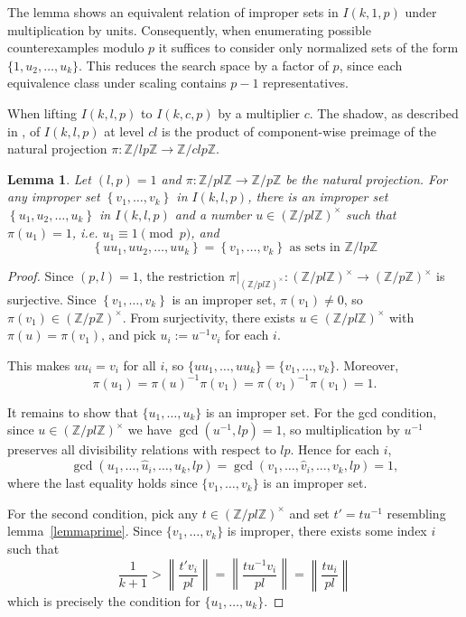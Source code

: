 \documentclass[10pt,leqno]{amsart}
\newtheorem{lemma}[theorem]{Lemma}
\newcommand{\set}[1]{\left\{#1\right\}}
\newcommand{\norm}[1]{\left\|#1\right\|}
\newcommand{\Int}[1]{\mathbb Z / #1 \mathbb Z}
\begin{document}
The lemma shows an equivalent relation of improper sets in $I(k, 1, p)$ under multiplication by units. 
Consequently, when enumerating possible counterexamples modulo $p$ it suffices to consider
only normalized sets of the form $\{1,u_2,\dots,u_k\}$.  This reduces the search space by a factor of $p$, since each equivalence class under scaling
contains $p-1$ representatives.

When lifting $I(k, l, p)$ to $I(k, c, p)$ by a multiplier $c$. The shadow, as described in \cite{Trakultongchai},
of $I(k, l, p)$ at level $cl$ is the product of component-wise preimage of the natural projection $\pi: \Int{lp} \to \Int{clp}$.

\begin{lemma}
  Let $(l, p) = 1$ and $\pi: \Int{pl} \to \Int{p}$ be the natural projection.
  For any improper set $\set{v_1, \dots, v_k}$ in $I(k, l, p)$, there is an improper set $\set{u_1, u_2, \dots, u_k}$ in $I(k, l, p)$
  and a number $u \in (\Int{pl})^\times$ such that $\pi(u_1) = 1$, i.e. $u_1 \equiv 1 \pmod{p}$,
  and \[ \set{uu_1, uu_2, \dots, uu_k} = \set{v_1, \dots, v_k} \text{ as sets in } \Int{lp} \]
\end{lemma}

\begin{proof}
  Since $(p, l) = 1$, the restriction $\pi|_{(\Int{pl})^\times} : (\Int{pl})^\times \to (\Int{p})^\times$ 
  is surjective. Since $\set{v_1,\dots,v_k}$ is an improper set, $\pi(v_1) \neq 0$, so 
  $\pi(v_1) \in (\Int{p})^\times$. From surjectivity, there exists $u \in (\Int{pl})^\times$ with $\pi(u) = \pi(v_1)$, 
  and pick $u_i := u^{-1} v_i$ for each $i$. 

  This makes $u u_i = v_i$ for all $i$, so 
  $\{u u_1, \dots, u u_k\} = \{v_1, \dots, v_k\}$. Moreover,
  \[
    \pi(u_1) = \pi(u)^{-1}\pi(v_1) = \pi(v_1)^{-1}\pi(v_1) = 1.
  \]

  It remains to show that $\{u_1, \dots, u_k\}$ is an improper set. For the gcd condition, 
  since $u \in (\Int{pl})^\times$ we have $\gcd(u^{-1}, lp) = 1$, so multiplication by $u^{-1}$ 
  preserves all divisibility relations with respect to $lp$. Hence for each $i$,
  \[
    \gcd(u_1, \dots, \hat{u}_i, \dots, u_k, lp) = \gcd(v_1, \dots, \hat{v}_i, \dots, v_k, lp) = 1,
  \]
  where the last equality holds since $\{v_1, \dots, v_k\}$ is an improper set.

  For the second condition, pick any $t \in (\Int{pl})^\times$ and set $t' = tu^{-1}$ resembling lemma~\ref{lemmaprime}.
  Since $\{v_1, \dots, v_k\}$ is improper, there exists some index $i$ such that
  \[
    \frac{1}{k+1} > \norm{\frac{t' v_i}{pl}} = \norm{\frac{t u^{-1} v_i}{pl}} 
    = \norm{\frac{t u_i}{pl}}
  \]
  which is precisely the condition for $\{u_1, \dots, u_k\}$.
\end{proof}
\end{document}
